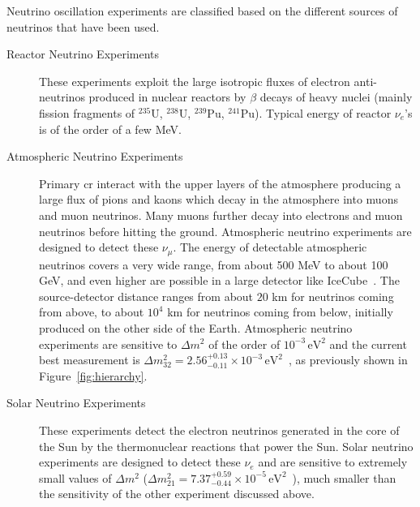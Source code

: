 
Neutrino oscillation experiments are classified based on the different sources of neutrinos that have been used. 
\begin{description}
\item[Reactor Neutrino Experiments] These experiments exploit the large isotropic fluxes of electron anti-neutrinos produced in nuclear reactors by $\beta$ decays of heavy nuclei (mainly fission fragments of $^{235}$U, $^{238}$U, $^{239}$Pu, $^{241}$Pu). Typical energy of reactor $\nu_e$'s is of the order of a few MeV. 
\item[Atmospheric Neutrino Experiments] Primary \acrshort{cr} interact with the upper layers of the atmosphere producing a large flux of pions and kaons which decay in the atmosphere into muons and muon neutrinos. Many muons further decay into electrons and muon neutrinos before hitting the ground. Atmospheric neutrino experiments are designed to detect these $\nu_\mu$. The energy of detectable atmospheric neutrinos covers a very wide range, from about 500 MeV to about 100 GeV, and even higher are possible in a large detector like IceCube~\cite{icecube}. The source-detector distance ranges from about $20$ km for neutrinos coming from above, to about $10^4$ km for neutrinos coming from below, initially produced on the other side of the Earth. Atmospheric neutrino experiments are sensitive to $\Delta m^2$ of the order of $10^{-3} \, \text{eV}^2$ and the current best measurement is $\Delta m^2_{32} = 2.56^{+0.13}_{-0.11} \times 10^{-3}\, \text{eV}^2$~\cite{pdg}, as previously shown in Figure~\ref{fig:hierarchy}.
\item[Solar Neutrino Experiments] These experiments detect the electron neutrinos generated in the core of the Sun by the thermonuclear reactions that power the Sun. Solar neutrino experiments are designed to detect these $\nu_e$ and are sensitive to extremely small values of $\Delta m^2$ ($\Delta m^2_{21} = 7.37^{+0.59}_{-0.44} \times 10^{-5}\, \text{eV}^2$~\cite{pdg}), much smaller than the sensitivity of the other experiment discussed above. 

\end{description}
